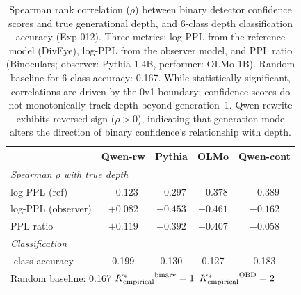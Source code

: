 \begin{table}[t]
  \centering
  \small
  \caption{Spearman rank correlation ($\rho$) between binary detector confidence scores and true generational depth, and 6-class depth classification accuracy (Exp-012). Three metrics: log-PPL from the reference model (DivEye), log-PPL from the observer model, and PPL ratio (Binoculars; observer: Pythia-1.4B, performer: OLMo-1B). Random baseline for 6-class accuracy: 0.167. While statistically significant, correlations are driven by the 0v1 boundary; confidence scores do not monotonically track depth beyond generation~1. Qwen-rewrite exhibits reversed sign ($\rho > 0$), indicating that generation mode alters the direction of binary confidence's relationship with depth.}
  \label{tab:s9_binary_spearman}
  \begin{tabular}{lcccc}
    \toprule
    & \textbf{Qwen-rw} & \textbf{Pythia} & \textbf{OLMo} & \textbf{Qwen-cont} \\
    \midrule
    \multicolumn{5}{l}{\textit{Spearman $\rho$ with true depth}} \\
    \quad log-PPL (ref)      & $-0.123$ & $-0.297$ & $-0.378$ & $-0.389$ \\
    \quad log-PPL (observer) & $+0.082$ & $-0.453$ & $-0.461$ & $-0.162$ \\
    \quad PPL ratio           & $+0.119$ & $-0.392$ & $-0.407$ & $-0.058$ \\
    \midrule
    \multicolumn{5}{l}{\textit{Classification}} \\
    \quad 6-class accuracy    & 0.199    & 0.130    & 0.127    & 0.183 \\
    \midrule
    \multicolumn{5}{l}{Random baseline: 0.167 \quad ${K^*_{\text{empirical}}}^{\text{binary}} = 1$ \quad ${K^*_{\text{empirical}}}^{\text{OBD}} = 2$} \\
    \bottomrule
  \end{tabular}
\end{table}

